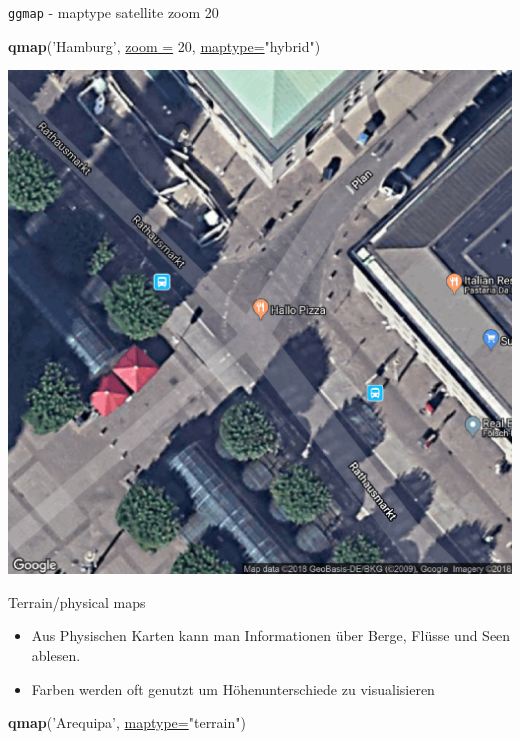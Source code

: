 \documentclass[ignorenonframetext,]{beamer}
\newenvironment{Shaded}{\begin{snugshade}}{\end{snugshade}}
\newcommand{\DataTypeTok}[1]{\textcolor[rgb]{0.74,0.68,0.62}{\underline{#1}}}
\newcommand{\DecValTok}[1]{\textcolor[rgb]{0.27,0.67,0.26}{#1}}
\newcommand{\KeywordTok}[1]{\textcolor[rgb]{0.26,0.66,0.93}{\textbf{#1}}}
\newcommand{\NormalTok}[1]{\textcolor[rgb]{0.74,0.68,0.62}{#1}}
\newcommand{\StringTok}[1]{\textcolor[rgb]{0.02,0.61,0.04}{#1}}
\begin{document}
\begin{frame}[fragile]{\texttt{ggmap} - maptype satellite zoom 20}
\protect\hypertarget{ggmap---maptype-satellite-zoom-20}{}

\begin{Shaded}
\begin{Highlighting}[]
\KeywordTok{qmap}\NormalTok{(}\StringTok{'Hamburg'}\NormalTok{, }\DataTypeTok{zoom =} \DecValTok{20}\NormalTok{, }\DataTypeTok{maptype=}\StringTok{"hybrid"}\NormalTok{)}
\end{Highlighting}
\end{Shaded}

\includegraphics{figure/ham_map.pdf}

\end{frame}

\begin{frame}[fragile]{Terrain/physical maps}
\protect\hypertarget{terrainphysical-maps}{}

\begin{itemize}
\item
  Aus Physischen Karten kann man Informationen über Berge, Flüsse und
  Seen ablesen.
\item
  Farben werden oft genutzt um Höhenunterschiede zu visualisieren
\end{itemize}

\begin{Shaded}
\begin{Highlighting}[]
\KeywordTok{qmap}\NormalTok{(}\StringTok{'Arequipa'}\NormalTok{, }\DataTypeTok{maptype=}\StringTok{"terrain"}\NormalTok{)}
\end{Highlighting}
\end{Shaded}

\end{frame}
\end{document}
